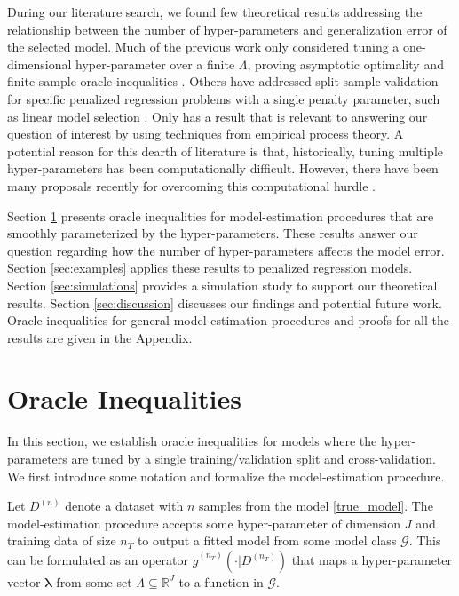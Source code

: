 \documentclass[12pt]{article}
\begin{document}
During our literature search, we found few theoretical results addressing the relationship between the number of hyper-parameters and generalization error of the selected model. 
Much of the previous work only considered tuning a one-dimensional hyper-parameter over a finite $\Lambda$, proving asymptotic optimality \citep{van2004asymptotic} and finite-sample oracle inequalities \citep{van2003unified, gyorfi2006distribution}. Others have addressed split-sample validation for specific penalized regression problems with a single penalty parameter, such as linear model selection \citep{li1987asymptotic, shao1997asymptotic, golub1979generalized, chetverikov2016cross, chatterjee2015prediction}. Only \citet{lecue2012oracle} has a result that is relevant to answering our question of interest by using techniques from empirical process theory. A potential reason for this dearth of literature is that, historically, tuning multiple hyper-parameters has been computationally difficult. However, there have been many proposals recently for overcoming this computational hurdle \citep{bengio2000gradient, foo2008efficient, snoek2012practical}.

Section \ref{sec:main_results} presents oracle inequalities for model-estimation procedures that are smoothly parameterized by the hyper-parameters. These results answer our question regarding how the number of hyper-parameters affects the model error.
Section \ref{sec:examples} applies these results to penalized regression models.
Section \ref{sec:simulations} provides a simulation study to support our theoretical results.
Section \ref{sec:discussion} discusses our findings and potential future work.
Oracle inequalities for general model-estimation procedures and proofs for all the results are given in the Appendix.


\section{Oracle Inequalities} \label{sec:main_results}

In this section, we establish oracle inequalities for models where the hyper-parameters are tuned by a single training/validation split and cross-validation. We first introduce some notation and formalize the model-estimation procedure. 

Let $D^{(n)}$ denote a dataset with $n$ samples from the model \eqref{true_model}. The model-estimation procedure accepts some hyper-parameter of dimension $J$ and training data of size $n_T$ to output a fitted model from some model class $\mathcal{G}$. This can be formulated as an operator $\hat{g}^{(n_T)}(\cdot | D^{(n_T)})$ that maps a hyper-parameter vector $\boldsymbol{\lambda}$ from some set $\Lambda \subseteq \mathbb{R}^J$ to a function in $\mathcal{G}$. 
\end{document}
